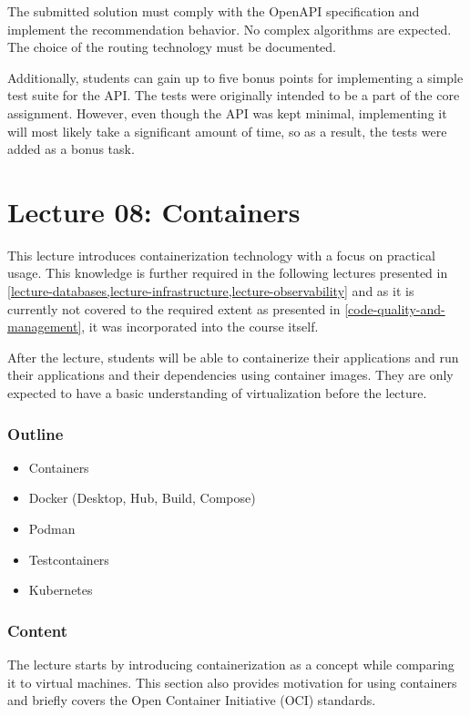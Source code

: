 \documentclass[
  digital,
  color,
  oneside,
  nosansbold,
  nocolorbold,
  nolof,
  nolot,
]{fithesis4}
\begin{document}
The submitted solution must comply with the OpenAPI specification and implement the recommendation behavior. No complex algorithms are expected. The choice of the routing technology must be documented.

Additionally, students can gain up to five bonus points for implementing a simple test suite for the API. The tests were originally intended to be a part of the core assignment. However, even though the API was kept minimal, implementing it will most likely take a significant amount of time, so as a result, the tests were added as a bonus task.

\section{Lecture 08: Containers}\label{lecture-containers}

This lecture introduces containerization technology with a focus on practical usage. This knowledge is further required in the following lectures presented in \cref{lecture-databases,lecture-infrastructure,lecture-observability} and as it is currently not covered to the required extent as presented in \cref{code-quality-and-management}, it was incorporated into the course itself.

After the lecture, students will be able to containerize their applications and run their applications and their dependencies using container images. They are only expected to have a basic understanding of virtualization before the lecture.

\subsubsection{Outline}

\begin{itemize}
    \item Containers
    \item Docker (Desktop, Hub, Build, Compose)
    \item Podman
    \item Testcontainers
    \item Kubernetes
\end{itemize}

\subsubsection{Content}

The lecture starts by introducing containerization as a concept while comparing it to virtual machines. This section also provides motivation for using containers and briefly covers the Open Container Initiative (OCI) standards.
\end{document}
